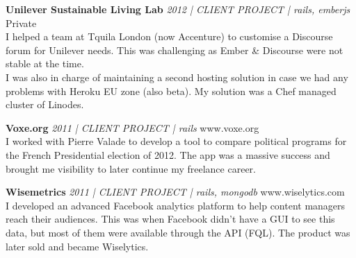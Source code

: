\documentclass[a4paper]{article}
\begin{document}
{\textbf{Unilever Sustainable Living Lab} \sl 2012 | CLIENT PROJECT | rails, emberjs} \hfill Private\\
I helped a team at Tquila London (now Accenture) to customise a Discourse forum for Unilever needs.
This was challenging as Ember \& Discourse were not stable at the time. \\
I was also in charge of maintaining a second hosting solution in case we had any problems with Heroku EU zone (also beta).
My solution was a Chef managed cluster of Linodes.\\

\pagebreak

{\textbf{Voxe.org} \sl 2011 | CLIENT PROJECT | rails} \hfill www.voxe.org\\
I worked with Pierre Valade to develop a tool to compare political programs for the French Presidential election of 2012.
The app was a massive success and brought me visibility to later continue my freelance career.\\
\vspace*{2mm}

{\textbf{Wisemetrics} \sl 2011 | CLIENT PROJECT | rails, mongodb} \hfill www.wiselytics.com\\
I developed an advanced Facebook analytics platform to help content managers reach their audiences.
This was when Facebook didn't have a GUI to see this data, but most of them were available through the API (FQL).
The product was later sold and became Wiselytics.\\
\vspace*{2mm}

\vspace*{2mm}
        

\ 
\end{document}
